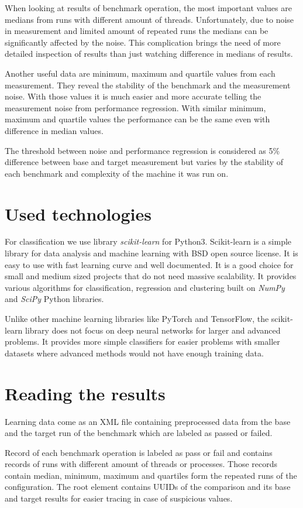 When looking at results of benchmark operation, the most important values are
medians from runs with different amount of threads. Unfortunately, due to noise in measurement
and limited amount of repeated runs the medians can be significantly affected by
the noise. This complication brings the need of more detailed inspection of
results than just watching difference in medians of results.

Another useful data are minimum, maximum and quartile values from each
measurement. They reveal the stability of the benchmark and the measurement
noise. With those values it is much easier and more accurate telling the
measurement noise from performance regression. With similar minimum, maximum and
quartile values the performance can be the same even with difference in median values.

The threshold between noise and performance regression is considered as 5\%
difference between base and target measurement but varies by the stability of
each benchmark and complexity of the machine it was run on.

\section{Used technologies}
For classification we use library \emph{scikit-learn} for Python3. Scikit-learn is
a simple library for data analysis and machine learning with BSD open source
license. It is easy to use with fast learning curve and well documented. It is
a good choice for small and medium sized projects that do not need massive
scalability. It provides various algorithms for classification, regression and
clustering built on \emph{NumPy} and \emph{SciPy} Python libraries.

Unlike other machine learning libraries like PyTorch and TensorFlow, the
scikit-learn library does not focus on deep neural networks for larger and
advanced problems. It provides more simple classifiers for easier problems
with smaller datasets where advanced methods would not have enough training
data.

\section{Reading the results}
Learning data come as an XML file containing preprocessed data from
the base and the target run of the benchmark which are labeled as passed or failed.

Record of each benchmark operation is labeled as pass or fail and contains
records of runs with different amount of threads or processes. Those records
contain median, minimum, maximum and quartiles form the repeated runs of the
configuration. The root element contains UUIDs of the comparison and its base
and target results for easier tracing in case of suspicious values.

